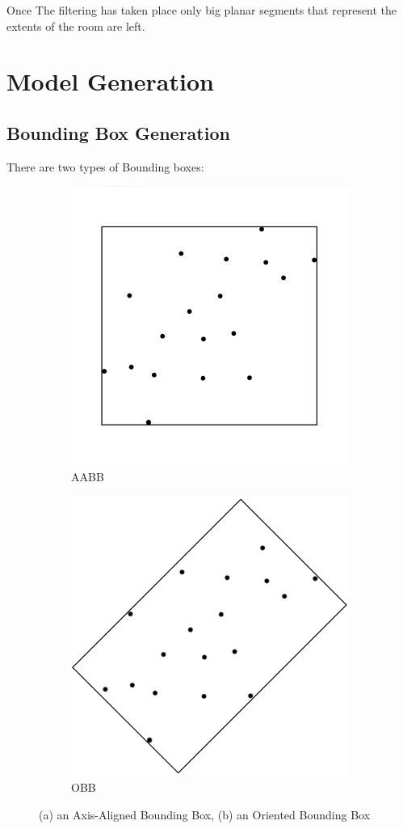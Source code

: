 			Once The filtering has taken place only big planar segments that represent the extents of the room are left.
			
		
\newpage
\section{Model Generation}
	\subsection{Bounding Box Generation}
		There are two types of Bounding boxes:
		
		\begin{figure}[H]
			\centering
			\begin{subfigure}{.5\textwidth}
				\centering
				\includegraphics[width=0.7\linewidth]{Includes/images/Axis-Aligned}
				\caption{AABB}
				\label{fig:AABB}
			\end{subfigure}%
			\begin{subfigure}{.5\textwidth}
				\centering
				\includegraphics[width=0.7\linewidth]{"Includes/images/Orienrted Bounding box"}
				\caption{OBB}
				\label{fig:OBB}
			\end{subfigure}
			\caption{(a) an Axis-Aligned Bounding Box, (b) an Oriented Bounding Box}
		\end{figure}
		
